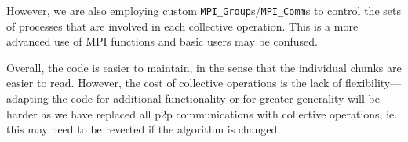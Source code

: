 	However, we are also employing custom \verb!MPI_Group!s/\verb!MPI_Comm!s to control the sets of processes that are involved in each collective operation. This is a more advanced use of MPI functions and basic users may be confused. 
	
	Overall, the code is easier to maintain, in the sense that the individual chunks are easier to read. However, the cost of collective operations is the lack of flexibility---adapting the code for additional functionality or for greater generality will be harder as we have replaced all p2p communications with collective operations, ie. this may need to be reverted if the algorithm is changed.




